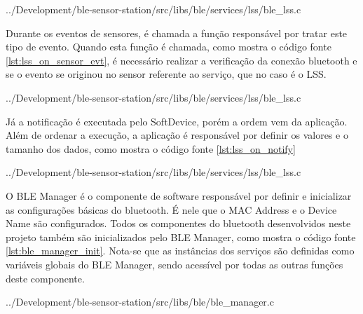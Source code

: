 \begin{minipage}{0.95\linewidth}  
 
{../Development/ble-sensor-station/src/libs/ble/services/lss/ble_lss.c}
\end{minipage}

Durante os eventos de sensores, é chamada a função responsável por
tratar este tipo de evento. Quando esta função é chamada, como mostra o código
fonte \ref{lst:lss_on_sensor_evt}, é necessário realizar a verificação da
conexão bluetooth e se o evento se originou no sensor referente ao serviço, que
no caso é o LSS.

\begin{minipage}{0.95\linewidth}  
 
{../Development/ble-sensor-station/src/libs/ble/services/lss/ble_lss.c}
\end{minipage}

Já a notificação é executada pelo SoftDevice, porém a ordem vem da aplicação.
Além de ordenar a execução, a aplicação é responsável por definir os valores e o
tamanho dos dados, como mostra o código fonte \ref{lst:lss_on_notify}

\begin{minipage}{0.95\linewidth}  
  
{../Development/ble-sensor-station/src/libs/ble/services/lss/ble_lss.c}
\end{minipage}


O BLE Manager é o componente de software responsável por definir e inicializar
as configurações básicas do bluetooth. É nele que o MAC Address e o Device Name
são configurados. Todos os componentes do bluetooth desenvolvidos neste projeto
também são inicializados pelo BLE Manager, como mostra o código fonte
\ref{lst:ble_manager_init}. Nota-se que as instâncias dos serviços são definidas
como variáveis globais do BLE Manager, sendo acessível por todas as outras
funções deste componente.

\begin{minipage}{0.95\linewidth} 
 
{../Development/ble-sensor-station/src/libs/ble/ble_manager.c}
\end{minipage}



